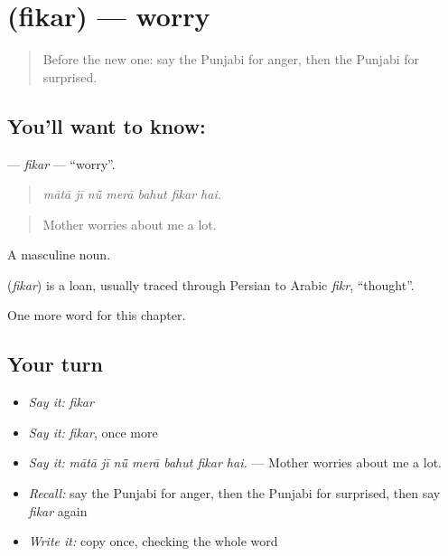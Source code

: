 \section[\texorpdfstring{\pa{ਫ਼ਿਕਰ} (fikar)}{ਫ਼ਿਕਰ (fikar)}]{ (fikar) — worry}

\label{lesson:PA-C326-fikar}



\begin{quote}
Before the new one: say the Punjabi for anger, then the Punjabi for surprised.
\end{quote}

\subsection*{You'll want to know: }
\textbf{} — \emph{fikar} — \textquotedblleft{}worry\textquotedblright{}.

\begin{quote}
      
\end{quote}

\begin{quote}
\emph{mātā jī nū̃ merā bahut fikar hai.}
\end{quote}

\begin{quote}
Mother worries about me a lot.
\end{quote}

A masculine noun.

\begin{cousinweb}
\textbf{} (\emph{fikar}) is a loan, usually traced through Persian to Arabic \emph{fikr}, \textquotedblleft{}thought\textquotedblright{}.
\end{cousinweb}

\begin{grammarlens}[title={What you've built}]
One more word for this chapter.
\end{grammarlens}

\subsection*{Your turn}
\begin{itemize}
\raggedright
  \item \emph{Say it:} \emph{fikar}
  \item \emph{Say it:} \emph{fikar}, once more
  \item \emph{Say it:} \emph{mātā jī nū̃ merā bahut fikar hai.} — Mother worries about me a lot.
  \item \emph{Recall:} say the Punjabi for anger, then the Punjabi for surprised, then say \emph{fikar} again
  \item \emph{Write it:} copy \textbf{} once, checking the whole word
\end{itemize}

